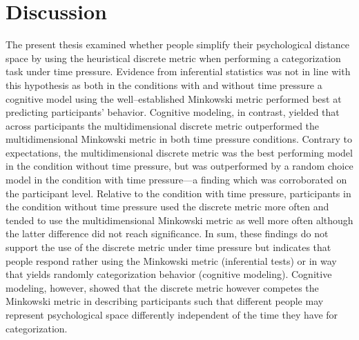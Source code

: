 \documentclass[a4paper,man,natbib]{apa6}
\begin{document}
\section{Discussion}
The present thesis examined whether people simplify their psychological distance space by using the heuristical discrete metric when performing a categorization task under time pressure. Evidence from inferential statistics was not in line with this hypothesis as both in the conditions with and without time pressure a cognitive model using the well--established Minkowski metric performed best at predicting participants' behavior. Cognitive modeling, in contrast, yielded that across participants the multidimensional discrete metric outperformed the multidimensional Minkowski metric in both time pressure conditions. Contrary to expectations, the multidimensional discrete metric was the best performing model in the condition without time pressure, but was outperformed by a random choice model in the condition with time pressure---a finding which was corroborated on the participant level. Relative to the condition with time pressure, participants in the condition without time pressure used the discrete metric more often and tended to use the multidimensional Minkowski metric as well more often although the latter difference did not reach significance. In sum, these findings do not support the use of the discrete metric under time pressure but indicates that people respond rather using the Minkowski metric (inferential tests) or in way that yields randomly categorization behavior (cognitive modeling). Cognitive modeling, however, showed that the discrete metric however competes the Minkowski metric in describing participants such that different people may represent psychological space differently independent of the time they have for categorization.


\end{document}
